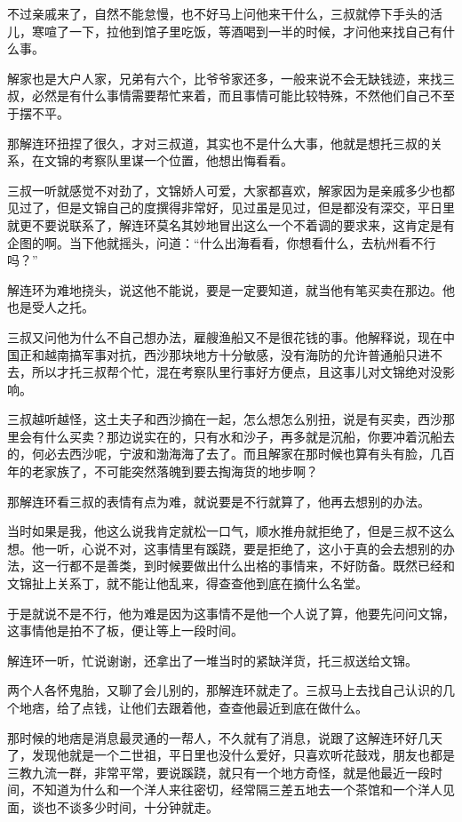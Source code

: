 不过亲戚来了，自然不能怠慢，也不好马上问他来干什么，三叔就停下手头的活儿，寒喧了一下，拉他到馆子里吃饭，等酒喝到一半的时候，才问他来找自己有什么事。

解家也是大户人家，兄弟有六个，比爷爷家还多，一般来说不会无缺钱迹，来找三叔，必然是有什么事情需要帮忙来着，而且事情可能比较特殊，不然他们自己不至于摆不平。

那解连环扭捏了很久，才对三叔道，其实也不是什么大事，他就是想托三叔的关系，在文锦的考察队里谋一个位置，他想出悔看看。

三叔一听就感觉不对劲了，文锦娇人可爱，大家都喜欢，解家因为是亲戚多少也都见过了，但是文锦自己的度撰得非常好，见过虽是见过，但是都没有深交，平日里就更不要说联系了，解连环莫名其妙地冒出这么一个不着调的要求来，这肯定是有企图的啊。当下他就摇头，问道：“什么出海看看，你想看什么，去杭州看不行吗？”

解连环为难地挠头，说这他不能说，要是一定要知道，就当他有笔买卖在那边。他也是受人之托。

三叔又问他为什么不自己想办法，雇艘渔船又不是很花钱的事。他解释说，现在中国正和越南搞军事对抗，西沙那块地方十分敏感，没有海防的允许普通船只进不去，所以才托三叔帮个忙，混在考察队里行事好方便点，且这事儿对文锦绝对没影响。

三叔越听越怪，这土夫子和西沙摘在一起，怎么想怎么别扭，说是有买卖，西沙那里会有什么买卖？那边说实在的，只有水和沙子，再多就是沉船，你要冲着沉船去的，何必去西沙呢，宁波和渤海海了去了。而且解家在那时候也算有头有脸，几百年的老家族了，不可能突然落魄到要去掏海货的地步啊？

那解连环看三叔的表情有点为难，就说要是不行就算了，他再去想别的办法。

当时如果是我，他这么说我肯定就松一口气，顺水推舟就拒绝了，但是三叔不这么想。他一听，心说不对，这事情里有蹊跷，要是拒绝了，这小于真的会去想别的办法，这一行都不是善类，到时候要做出什么出格的事情来，不好防备。既然已经和文锦扯上关系丁，就不能让他乱来，得查查他到底在摘什么名堂。

于是就说不是不行，他为难是因为这事情不是他一个人说了算，他要先问问文锦，这事情他是拍不了板，便让等上一段时间。

解连环一听，忙说谢谢，还拿出了一堆当时的紧缺洋货，托三叔送给文锦。

两个人各怀鬼胎，又聊了会儿别的，那解连环就走了。三叔马上去找自己认识的几个地痞，给了点钱，让他们去跟着他，查查他最近到底在做什么。

那时候的地痞是消息最灵通的一帮人，不久就有了消息，说跟了这解连环好几天了，发现他就是一个二世祖，平日里也没什么爱好，只喜欢听花鼓戏，朋友也都是三教九流一群，非常平常，要说蹊跷，就只有一个地方奇怪，就是他最近一段时间，不知道为什么和一个洋人来往密切，经常隔三差五地去一个茶馆和一个洋人见面，谈也不谈多少时间，十分钟就走。

